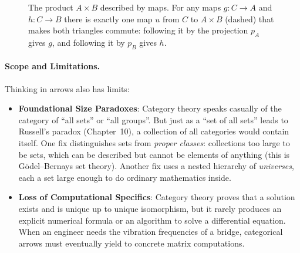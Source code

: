 \begin{figure}[htbp]
\centering
{}
\caption{The product $A \times B$ described by maps. For any maps $g: C \to A$ and $h: C \to B$ there is exactly one map $u$ from $C$ to $A \times B$ (dashed) that makes both triangles commute: following it by the projection $p_A$ gives $g$, and following it by $p_B$ gives $h$.}
\label{32:fig-product-universal}
\end{figure}

\paragraph{Scope and Limitations.}
Thinking in arrows also has limits:
\begin{itemize}
  \item \textbf{Foundational Size Paradoxes}: Category theory speaks casually of the category of ``all sets'' or ``all groups''. But just as a ``set of all sets'' leads to Russell's paradox (Chapter~10), a collection of all categories would contain itself. One fix distinguishes sets from \emph{proper classes}: collections too large to be sets, which can be described but cannot be elements of anything (this is G\"odel--Bernays set theory). Another fix uses a nested hierarchy of \emph{universes}, each a set large enough to do ordinary mathematics inside.
  \item \textbf{Loss of Computational Specifics}: Category theory proves that a solution exists and is unique up to unique isomorphism, but it rarely produces an explicit numerical formula or an algorithm to solve a differential equation. When an engineer needs the vibration frequencies of a bridge, categorical arrows must eventually yield to concrete matrix computations.
\end{itemize}

